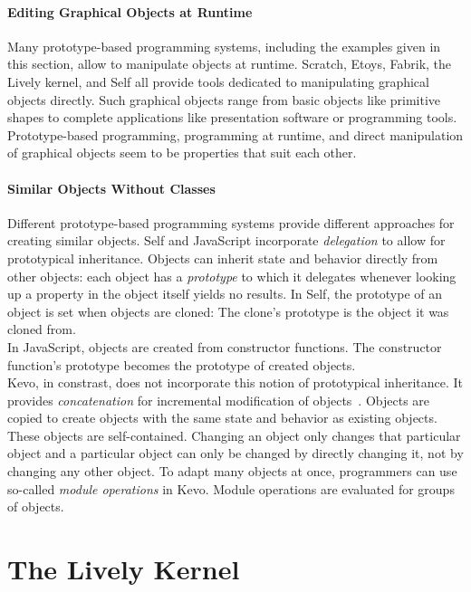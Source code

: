 \paragraph{Editing Graphical Objects at Runtime}
Many prototype-based programming systems, including the examples given in this section, allow to manipulate objects at runtime.
Scratch, Etoys, Fabrik, the Lively kernel, and Self all provide tools dedicated to manipulating graphical objects directly.
Such graphical objects range from basic objects like primitive shapes to complete applications like presentation software or programming tools.
Prototype-based programming, programming at runtime, and direct manipulation of graphical objects seem to be properties that suit each other.

\paragraph{Similar Objects Without Classes}
Different prototype-based programming systems provide different approaches for creating similar objects.
Self and JavaScript incorporate \emph{delegation} to allow for prototypical inheritance.
Objects can inherit state and behavior directly from other objects: each object has a \emph{prototype} to which it delegates whenever looking up a property in the object itself yields no results.
In Self, the prototype of an object is set when objects are cloned: The clone's prototype is the object it was cloned from.\\
In JavaScript, objects are created from constructor functions.
The constructor function's prototype becomes the prototype of created objects.\\
Kevo, in constrast, does not incorporate this notion of prototypical inheritance.
It provides \emph{concatenation} for incremental modification of objects~\cite{Taivalsaari1995DVC}.
Objects are copied to create objects with the same state and behavior as existing objects.
These objects are self-contained.
Changing an object only changes that particular object and a particular object can only be changed by directly changing it, not by changing any other object.
To adapt many objects at once, programmers can use so-called \emph{module operations} in Kevo.
Module operations are evaluated for groups of objects.


\section{The Lively Kernel}

